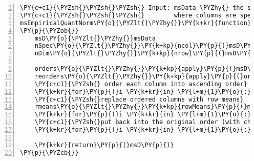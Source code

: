 \begin{Verbatim}[commandchars=\\\{\},codes={\catcode`\$=3\catcode`\^=7\catcode`\_=8},gobble=0,numbers=left,fontfamily=fvm,fontshape=n,fontsize=\footnotesize,tabsize=2]
\PY{c+c1}{\PYZsh{}\PYZsh{}\PYZsh{} Input: msData \PYZhy{} the spectra intensities in matrix}
\PY{c+c1}{\PYZsh{}\PYZsh{}\PYZsh{}        where columns are spectra $1,2,\hdots,n$}
msEmpiricalQuantNorm\PY{o}{\PYZlt{}\PYZhy{}}\PY{k+kr}{function}\PY{p}{(}msData\PY{p}{)}
\PY{p}{\PYZob{}}
	msD\PY{o}{\PYZlt{}\PYZhy{}}msData
	nSpec\PY{o}{\PYZlt{}\PYZhy{}}\PY{k+kp}{ncol}\PY{p}{(}msD\PY{p}{)}
	nDim\PY{o}{\PYZlt{}\PYZhy{}}\PY{k+kp}{nrow}\PY{p}{(}msD\PY{p}{)}

	orders\PY{o}{\PYZlt{}\PYZhy{}}\PY{k+kp}{apply}\PY{p}{(}msD\PY{p}{,} \PY{l+m}{2}\PY{p}{,} \PY{k+kp}{order}\PY{p}{)}
	reorders\PY{o}{\PYZlt{}\PYZhy{}}\PY{k+kp}{apply}\PY{p}{(}orders\PY{p}{,} \PY{l+m}{2}\PY{p}{,} \PY{k+kp}{order}\PY{p}{)}
	\PY{c+c1}{\PYZsh{} order each column into ascending order}
	\PY{k+kr}{for}\PY{p}{(}i \PY{k+kr}{in} \PY{l+m}{1}\PY{o}{:}nSpec\PY{p}{)} msD\PY{p}{[}\PY{p}{,}i\PY{p}{]}\PY{o}{\PYZlt{}\PYZhy{}}msD\PY{p}{[}orders\PY{p}{[}\PY{p}{,}i\PY{p}{]}\PY{p}{,}i\PY{p}{]}
	\PY{c+c1}{\PYZsh{}replace ordered columns with row means}
	rmeans\PY{o}{\PYZlt{}\PYZhy{}}\PY{k+kp}{rowMeans}\PY{p}{(}msD\PY{p}{)}
	\PY{k+kr}{for}\PY{p}{(}i \PY{k+kr}{in} \PY{l+m}{1}\PY{o}{:}nSpec\PY{p}{)} msD\PY{p}{[}\PY{p}{,}i\PY{p}{]}\PY{o}{\PYZlt{}\PYZhy{}}rmeans
	\PY{c+c1}{\PYZsh{}put back into the original order (with changed values)}
	\PY{k+kr}{for}\PY{p}{(}i \PY{k+kr}{in} \PY{l+m}{1}\PY{o}{:}nSpec\PY{p}{)} msD\PY{p}{[}\PY{p}{,}i\PY{p}{]}\PY{o}{\PYZlt{}\PYZhy{}}msD\PY{p}{[}reorders\PY{p}{[}\PY{p}{,}i\PY{p}{]}\PY{p}{,}i\PY{p}{]}

	\PY{k+kr}{return}\PY{p}{(}msD\PY{p}{)}
\PY{p}{\PYZcb{}}
\end{Verbatim}
